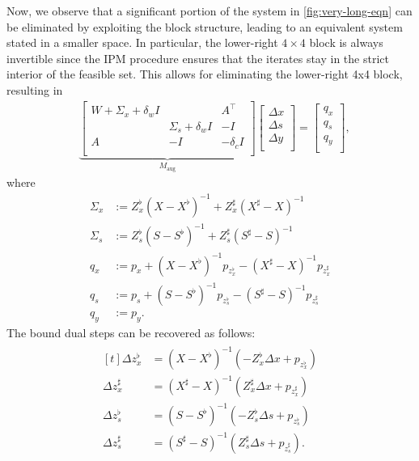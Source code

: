 \documentclass{IEEEtran4PSCC} %
\begin{document}
Now, we observe that a significant portion of the system in \eqref{fig:very-long-eqn} can be eliminated by exploiting the block
structure, leading to an equivalent system stated in a smaller
space. In particular, the lower-right $4\times 4$ block is always
invertible since the IPM procedure ensures that the iterates stay in
the strict interior of the feasible set. This allows for eliminating
the lower-right 4x4 block, resulting in
\begin{align}\label{eqn:very-long-reduced}
  &
    \underbrace{
    \begin{bmatrix}
      W  + \Sigma_x + \delta_w I & & A^{\top} \\
      & \Sigma_s + \delta_w I & -I\\
      A& -I & -\delta_c I\\
    \end{bmatrix}
  }_{M_{\text{aug}}}
  \begin{bmatrix}
    \Delta x \\
    \Delta s \\
    \Delta y \\
  \end{bmatrix}=
  \begin{bmatrix}
    q_x \\
    q_s\\
    q_y\\
  \end{bmatrix},
\end{align}
where
\begin{align*}
  \Sigma_x&:= Z^\flat_x (X-X^\flat)^{-1}+ Z^\sharp_x (X^\sharp-X)^{-1}\\
  \Sigma_s&:= Z^\flat_s (S-S^\flat)^{-1}+ Z^\sharp_s (S^\sharp-S)^{-1}\\
  q_x&:=p_x + (X-X^\flat)^{-1} p_{z^\flat_x}-  (X^\sharp-X)^{-1} p_{z^\sharp_x}\\
  q_s&:=p_s + (S-S^\flat)^{-1} p_{z^\flat_s}-  (S^\sharp-S)^{-1} p_{z^\sharp_s}\\
  q_y&:=p_y.
\end{align*}
The bound dual steps can be recovered as follows:
\begin{align}\label{eqn:recover-1}
  \begin{aligned}[t]
    \Delta z^\flat_x &= \left(X-X^\flat\right)^{-1} \left(-Z^\flat_x \Delta x  + p_{z^\flat_x}\right)\\
    \Delta z^\sharp_x &= \left(X^\sharp-X\right)^{-1} \left(Z^\sharp_x \Delta x  + p_{z^\sharp_x}\right)\\
    \Delta z^\flat_s &= \left(S-S^\flat\right)^{-1} \left(-Z^\flat_s \Delta s  + p_{z^\flat_s}\right)\\
    \Delta z^\sharp_s &= \left(S^\sharp-S\right)^{-1} \left(Z^\sharp_s \Delta s  + p_{z^\sharp_s}\right).
  \end{aligned}
\end{align}
\end{document}
